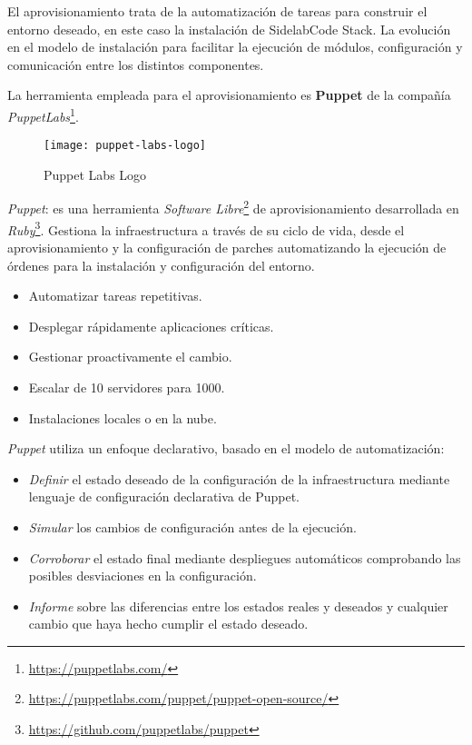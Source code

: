 \par El aprovisionamiento trata de la automatización de tareas para construir el entorno deseado, en este caso la instalación de SidelabCode Stack. La evolución en el modelo de instalación para facilitar la ejecución de módulos, configuración y comunicación entre los distintos componentes.

\par La herramienta empleada para el aprovisionamiento es \textbf{Puppet} de la compañía \emph{PuppetLabs}\footnote{\url{https://puppetlabs.com/}}.

\begin{figure}[H]
    \centering
    \texttt{[image: puppet-labs-logo]}
    \caption{Puppet Labs Logo}
    \label{fig:puppet-labs}
\end{figure}

\par \emph{Puppet}: es una herramienta \emph{Software Libre}\footnote{\url{https://puppetlabs.com/puppet/puppet-open-source/}} de aprovisionamiento desarrollada en \emph{Ruby}\footnote{\url{https://github.com/puppetlabs/puppet}}. Gestiona la infraestructura a través de su ciclo de vida, desde el aprovisionamiento y la configuración de parches automatizando la ejecución de órdenes para la instalación y configuración del entorno.

\begin{itemize}
	\item Automatizar tareas repetitivas.
	\item Desplegar rápidamente aplicaciones críticas.
	\item Gestionar proactivamente el cambio.
	\item Escalar de 10 servidores para 1000.
	\item Instalaciones locales o en la nube.
\end{itemize}

\par \emph{Puppet} utiliza un enfoque declarativo, basado en el modelo de automatización:
\begin{itemize}
	\item \emph{Definir} el estado deseado de la configuración de la infraestructura mediante lenguaje de configuración declarativa de Puppet.
	\item \emph{Simular} los cambios de configuración antes de la ejecución.
	\item \emph{Corroborar} el estado final mediante despliegues automáticos comprobando las posibles desviaciones en la configuración.
	\item \emph{Informe} sobre las diferencias entre los estados reales y deseados y cualquier cambio que haya hecho cumplir el estado deseado.
\end{itemize}

